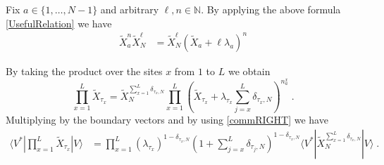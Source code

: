 \documentclass[10pt]{article}
\numberwithin{equation}{section}
\numberwithin{equation}{subsection}
\newcommand{\dt}{\;.}
\begin{document}
Fix $ a\in \{1,\ldots,N-1\}$ and arbitrary $ \ell,n\in \mathbb{N}$. By applying the above formula \eqref{UsefulRelation} we have
\begin{align}\label{usefulRelaton-many}
	\widetilde{X}_{a}^{n}\widetilde{X}_{N}^{\ell}&=%
	\widetilde{X}_{N}^{\ell}\left(\widetilde{X}_{a}+\ell\lambda_{a}\right)^{n}
\end{align}
\begin{comment}
therefore 
\begin{align*}
	\widetilde{X}_{1}^{n_{1}}\ldots\widetilde{X}_{N-1}^{n_{N-1}}\widetilde{X}_{N}^{n_{N}}=\widetilde{X}_{N}^{n_{N}}\prod_{a=1}^{N-1}\left(\widetilde{X}_{a}+n_{N}\lambda_{a}\right)^{n_{a}}\dt
\end{align*}
\end{comment}
By taking the product over the sites $x$ from $1$ to $L$ we obtain 
\begin{equation}
	\prod_{x=1}^{L}\widetilde{X}_{\tau_{x}}=\widetilde{X}_{N}^{\sum_{x=1}^{L}\delta_{\tau_{x},N}}\prod_{x=1}^{L}\left(\widetilde{X}_{\tau_{x}}+\lambda_{\tau_{x}}\sum_{j=x}^{L}\delta_{\tau_{x},N}\right)^{n_{a}^{x}}\dt
\end{equation}
Multiplying by the boundary vectors and by using \eqref{commRIGHT} we have 
\begin{align}
	\langle V^{*}|\prod_{x=1}^{L}\widetilde{X}_{\tau_{x}}
	|V \rangle\nonumber&=
	\prod_{x=1}^{L}\left(\lambda_{\tau_{x}}\right)^{1-\delta_{\tau_{x},N}}\left(1+\sum_{j=x}^{L}\delta_{\tau_{j},N}\right)^{1-\delta_{\tau_{x},N}}\langle V^{*}|\widetilde{X}_{N}^{\sum_{x=1}^{L}\delta_{\tau_{x},N}}|V\rangle \dt
\end{align}
\end{document}
